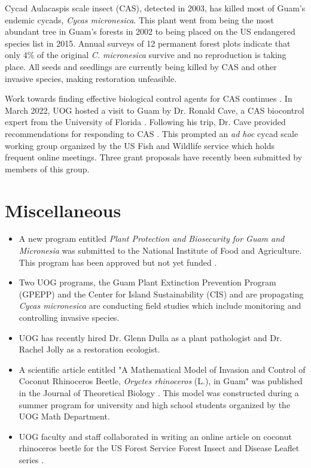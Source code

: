 \documentclass[twocolumn]{scrartcl}
\begin{document}
Cycad Aulacaspis scale insect (CAS), detected in 2003, has killed most of Guam’s endemic cycads, \textit{Cycas micronesica}. This plant went from being the
most abundant tree in Guam’s forests in 2002 to being placed on the US endangered species list in 2015. Annual surveys of 12 permanent forest
plots indicate that only 4\% of the original \textit{C. micronesica} survive and no reproduction is taking place. All seeds and seedlings are currently being killed by CAS and other invasive species, making restoration unfeasible. 

Work towards finding effective biological control agents for CAS continues \cite{caveBiologicalControlCycad2022}. In March 2022, UOG hosted a visit to Guam by Dr. Ronald Cave, a CAS biocontrol expert from the University of Florida \cite{caveBiologicalControlCycad2022a}. Following his trip, Dr. Cave provided recommendations for responding to CAS \cite{caveReportUSFish2022}. This prompted an \textit{ad hoc} cycad scale working group organized by the US Fish and Wildlife service which holds frequent online meetings. Three grant proposals have recently been submitted by members of this group.

\section{Miscellaneous}

\begin{itemize}
	\item A new program entitled \textit{Plant Protection and Biosecurity for Guam and Micronesia} was submitted to the National Institute of Food and Agriculture. This program has been approved but not yet funded \cite{NIFA2022}.

	\item Two UOG programs, the Guam Plant Extinction Prevention Program (GPEPP) and the Center for Island Sustainability (CIS) and are propagating \textit{Cycas micronesica} are conducting field studies which include monitoring and controlling invasive species. 
	
	\item UOG has recently hired Dr. Glenn Dulla as a plant pathologist and Dr. Rachel Jolly as a restoration ecologist.
	
	\item A scientific article entitled "A Mathematical Model of Invasion and Control of Coconut Rhinoceros Beetle, \textit{Oryctes rhinoceros} (L.), in Guam" was published in the Journal of Theoretical Biology \cite{caasiMathematicalModelInvasion2023}. This model was  constructed during a summer program for university and high school students organized by the UOG Math Department. 
	
	\item UOG faculty and staff collaborated in writing an online article on coconut rhinoceros beetle for the US Forest Service Forest Insect and Disease Leaflet series \cite{mooreCoconutRhinocerosBeetle2023}.
	
\end{itemize}

\printbibliography
\end{document}
